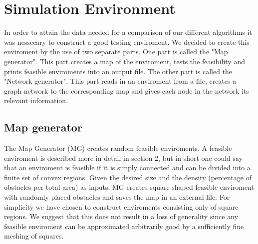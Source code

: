 \chapter{Simulation Environment}
In order to attain the data needed for a comparison of our different algorithms it was nessecary to construct a good testing enviroment. We decided to create this enviroment by the use of two separate parts. One part is called the "Map generator". This part creates a map of the enviroment, tests the feasibility and prints feasible enviroments into an output file. The other part is called the "Network generator". This part reads in an enviroment from a file, creates a graph network to the corresponding map and gives each node in the network its relevant information.\\

\section{Map generator}
The Map Generator (MG) creates random feasible enviroments. A feasible enviroment is described more in detail in section 2, but in short one could say that an enviroment is feasible if it is simply connected and can be divided into a finite set of convex regions. Given the desired size and the density (percentage of obstacles per total area) as inputs, MG creates square shaped feasible enviroment with randomly placed obstacles and saves the map in an external file. For simplicity we have chosen to construct enviroments consisting only of square regions. We suggest that this does not result in a loss of generality since any feasible enviroment can be approximated arbitrarily good by a sufficiently fine meshing of squares. \\


